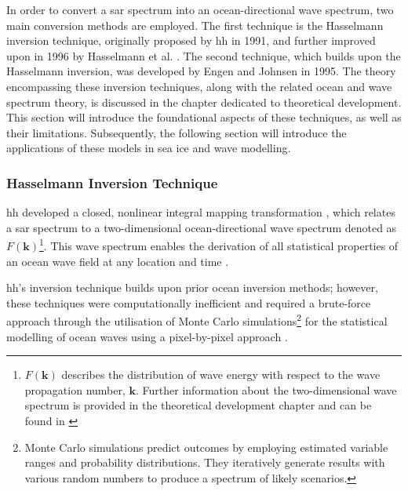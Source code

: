 In order to convert a \acs{sar} spectrum into an ocean-directional wave spectrum, two main conversion methods are employed. The first technique is the Hasselmann inversion technique, originally proposed by \ac{hh} \cite{Hasselmann1991} in 1991, and further improved upon in 1996 by Hasselmann et al. \cite{Hasselmann1996}. The second technique, which builds upon the Hasselmann inversion, was developed by Engen and Johnsen \cite{Engen1995} in 1995. The theory encompassing these inversion techniques, along with the related ocean and wave spectrum theory, is discussed in the chapter dedicated to theoretical development. This section will introduce the foundational aspects of these techniques, as well as their limitations. Subsequently, the following section will introduce the applications of these models in sea ice and wave modelling.

\subsubsection{Hasselmann Inversion Technique} \label{subsubsec:litReview.sarCharac.oceanWaveInversion.Hasselmann}

\ac{hh} developed a closed, nonlinear integral mapping transformation \cite{Wadhams2002}, which relates a \acs{sar} spectrum to a two-dimensional ocean-directional wave spectrum denoted as $F(\mathbf{k})$\footnote{$F(\mathbf{k})$ describes the distribution of wave energy with respect to the wave propagation number, $\mathbf{k}$. Further information about the two-dimensional wave spectrum is provided in the theoretical development chapter and can be found in \cite{Hasselmann1991, Holthuijsen2007}}. This wave spectrum enables the derivation of all statistical properties of an ocean wave field at any location and time \cite{Hasselmann1991}.

\ac{hh}'s inversion technique builds upon prior ocean inversion methods; however, these techniques were computationally inefficient and required a brute-force approach through the utilisation of Monte Carlo simulations\footnote{Monte Carlo simulations predict outcomes by employing estimated variable ranges and probability distributions. They iteratively generate results with various random numbers to produce a spectrum of likely scenarios.} for the statistical modelling of ocean waves using a pixel-by-pixel approach \cite{Hasselmann1991}.

